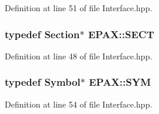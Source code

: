 \-Definition at line 51 of file \-Interface.\-hpp.

\hypertarget{namespace_e_p_a_x_a6c4fe59392073737d60d4b99f37ba154}{
\subsubsection[{\-S\-E\-C\-T}]{\setlength{\rightskip}{0pt plus 5cm}typedef {\bf \-Section}$\ast$ {\bf \-E\-P\-A\-X\-::\-S\-E\-C\-T}}}\label{namespace_e_p_a_x_a6c4fe59392073737d60d4b99f37ba154}


\-Definition at line 48 of file \-Interface.\-hpp.

\hypertarget{namespace_e_p_a_x_acad75cfc5d20dbf9de18b17dfe451b42}{
\subsubsection[{\-S\-Y\-M}]{\setlength{\rightskip}{0pt plus 5cm}typedef {\bf \-Symbol}$\ast$ {\bf \-E\-P\-A\-X\-::\-S\-Y\-M}}}\label{namespace_e_p_a_x_acad75cfc5d20dbf9de18b17dfe451b42}


\-Definition at line 54 of file \-Interface.\-hpp.



